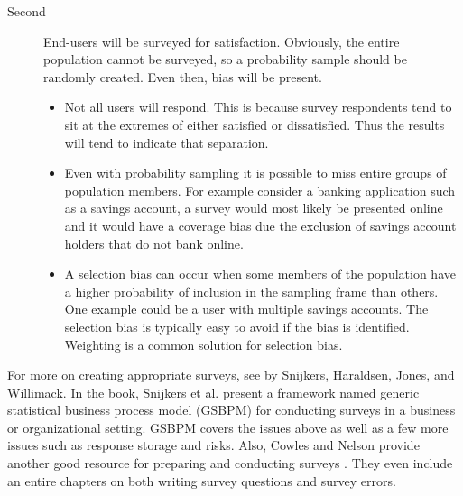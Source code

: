 \documentclass[SDSUThesis.tex]{subfiles}
\begin{document}
\begin{description}
\begin{description}
                    \item[Second] End-users will be surveyed for satisfaction. Obviously, the 
                    entire population cannot be surveyed, so a probability sample should 
                    be randomly created. Even then, bias will be present.  
                        \begin{itemize}
                            \item Not all users will respond.  This is because survey 
                                respondents tend to sit at the extremes of either 
                                satisfied or dissatisfied.  Thus the results will tend 
                                to indicate that separation. 
                            \item  Even with probability sampling it is possible to miss 
                                entire groups of population members. For example consider a 
                                banking application such as a savings account, a survey would 
                                most likely be presented online and it would have a coverage 
                                bias due the exclusion of savings account holders that 
                                do not bank online.
                            \item A selection bias can occur when some members of the 
                                population have a higher probability of inclusion in 
                                the sampling frame than others.  One example could be 
                                a user with multiple savings accounts.  The selection 
                                bias is typically easy to avoid if the bias is 
                                identified.  Weighting is a common solution for selection bias. 
                        \end{itemize}
                       
                    \end{description}
                
                \end{description}
                
                
           
            For more on creating appropriate surveys, see \cite{Snijkers2013} by Snijkers,
            Haraldsen, Jones, and Willimack. In the book, Snijkers et al. present a framework
            named generic statistical business process model (GSBPM) for conducting surveys
            in a business or organizational setting.  GSBPM covers the issues above as well
            as a few more issues such as response storage and risks.  Also, Cowles and Nelson
            provide another good resource for preparing and conducting surveys 
            \cite{Cowles2015}.  They even include an entire chapters on both writing 
            survey questions and survey errors. 
            
\end{document}

